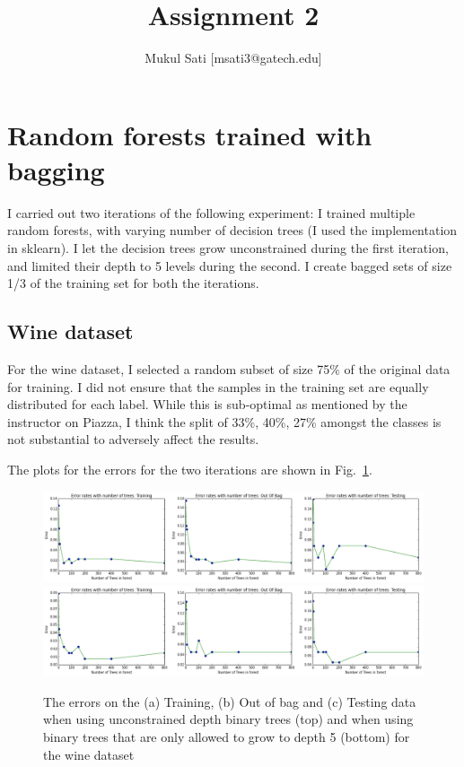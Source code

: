 \documentclass[5pt]{article}
\begin{document}
\title{Assignment 2}
\author{Mukul Sati [msati3@gatech.edu]}
\maketitle

\section{Random forests trained with bagging}
I carried out two iterations of the following experiment: I trained multiple
random forests, with varying number of decision trees (I used the
implementation in sklearn). I let the decision trees grow unconstrained during
the first iteration, and limited their depth to 5 levels during the second. I
create bagged sets of size 1/3 of the training set for both the iterations.

\subsection{Wine dataset}
For the wine dataset, I selected a random subset of size 75\% of the original data
for training. I did not ensure that the samples in the training set are equally
distributed for each label. While this is sub-optimal as mentioned by the
instructor on Piazza, I think the split of {33\%, 40\%, 27\%} amongst the classes
is not substantial to adversely affect the results.

The plots for the errors for the two iterations are shown in Fig.~\ref{fig:errorsWine}.

\begin{figure}
  \includegraphics[width=\textwidth]{images/baggingDepthInfiniteWine.png}
  \includegraphics[width=\textwidth]{images/baggingDepthLimitedWine.png}
\label{fig:errorsWine}
\caption{The errors on the (a) Training, (b) Out of bag and (c) Testing data when
  using unconstrained depth binary trees (top) and when using binary trees that
are only allowed to grow to depth 5 (bottom) for the wine dataset}
\end{figure}
\end{document}

